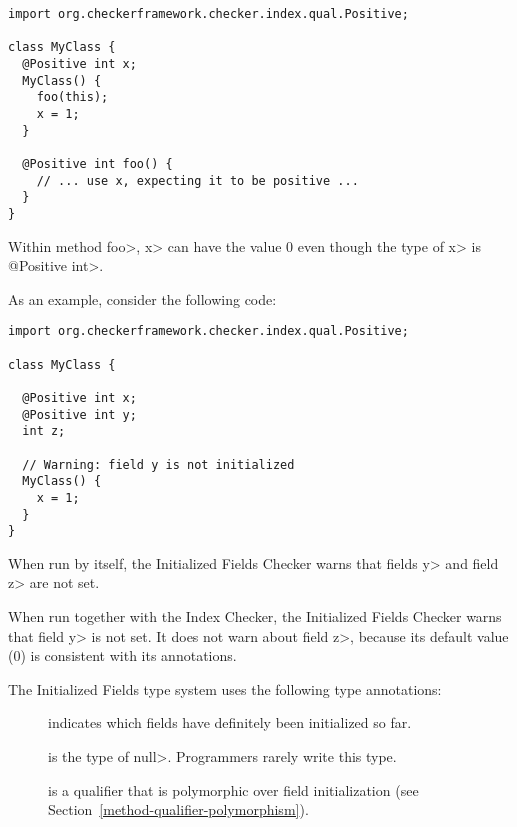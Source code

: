 \begin{Verbatim}
import org.checkerframework.checker.index.qual.Positive;

class MyClass {
  @Positive int x;
  MyClass() {
    foo(this);
    x = 1;
  }

  @Positive int foo() {
    // ... use x, expecting it to be positive ...
  }
}
\end{Verbatim}

\noindent
Within method \<foo>, \<x> can have the value 0 even though the type of
\<x> is \<@Positive int>.



As an example, consider the following code:

\begin{Verbatim}
import org.checkerframework.checker.index.qual.Positive;

class MyClass {

  @Positive int x;
  @Positive int y;
  int z;

  // Warning: field y is not initialized
  MyClass() {
    x = 1;
  }
}
\end{Verbatim}

When run by itself, the Initialized Fields Checker warns that fields \<y>
and field \<z> are not set.

When run together with the Index Checker, the Initialized Fields Checker
warns that field \<y> is not set.  It does not warn about field \<z>,
because its default value (0) is consistent with its annotations.



The Initialized Fields type system uses the following type annotations:
\begin{description}
\item[]
  indicates which fields have definitely been initialized so far.
\item[]
  is the type of \<null>.  Programmers rarely write this type.
\item[]
  is a qualifier that is polymorphic over field initialization (see
  Section~\ref{method-qualifier-polymorphism}).
\end{description}


